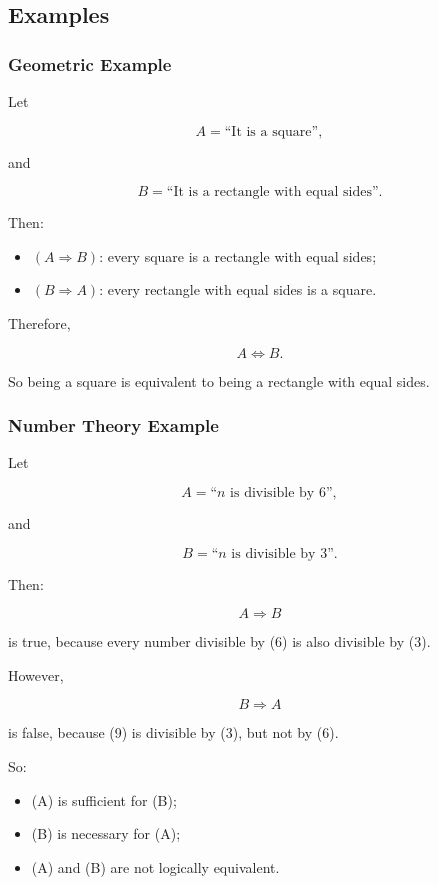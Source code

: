 \subsection{Examples}

\subsubsection{Geometric Example}

Let

\[
A = \text{``It is a square''},
\]

and

\[
B = \text{``It is a rectangle with equal sides''}.
\]

Then:

\begin{itemize}
\item $(A \Rightarrow B)$: every square is a rectangle with equal sides;
\item $(B \Rightarrow A)$: every rectangle with equal sides is a square.
\end{itemize}

Therefore,

\[
A \Leftrightarrow B.
\]

So being a square is equivalent to being a rectangle with equal sides.

\subsubsection{Number Theory Example}

Let

\[
A = \text{``$n$ is divisible by $6$''},
\]

and

\[
B = \text{``$n$ is divisible by $3$''}.
\]

Then:

\[
A \Rightarrow B
\]

is true, because every number divisible by (6) is also divisible by (3).

However,

\[
B \Rightarrow A
\]

is false, because (9) is divisible by (3), but not by (6).

So:

\begin{itemize}
\item (A) is sufficient for (B);
\item (B) is necessary for (A);
\item (A) and (B) are not logically equivalent.
\end{itemize}

